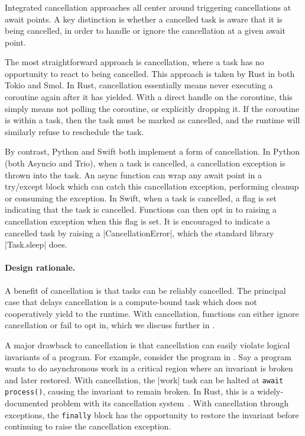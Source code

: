 \subsubsection{\Awareness}
\label{ssec:designdims:cooperation}

Integrated cancellation approaches all center around triggering cancellations at await points. A key distinction is whether a cancelled task is aware that it is being cancelled, in order to handle or ignore the cancellation at a given await point.

The most straightforward approach is \unaware cancellation, where a task has no opportunity to react to being cancelled. This approach is taken by Rust in both Tokio and Smol. In Rust, cancellation essentially means never executing a coroutine again after it has yielded. With a direct handle on the coroutine, this simply means not polling the coroutine, or explicitly dropping it. If the coroutine is within a task, then the task must be marked as cancelled, and the runtime will similarly refuse to reschedule the task.

By contrast, Python and Swift both implement a form of \aware cancellation. In Python (both Asyncio and Trio), when a task is cancelled, a cancellation exception is thrown into the task. An async function can wrap any await point in a try/except block which can catch this cancellation exception, performing cleanup or consuming the exception.
%
In Swift, when a task is cancelled, a flag is set indicating that the task is cancelled. Functions can then opt in to raising a cancellation exception when this flag is set. It is encouraged to indicate a cancelled task by raising a \code|CancellationError|, which the standard library \code|Task.sleep| does.

\paragraph{Design rationale.} A benefit of \unaware cancellation is that tasks can be reliably cancelled. The principal case that delays \unaware cancellation is a compute-bound task which does not cooperatively yield to the runtime. With \aware cancellation, functions can either ignore cancellation or fail to opt in, which we discuss further in .

A major drawback to \unaware cancellation is that cancellation can easily violate logical invariants of a program. For example, consider the program in . Say a program wants to do asynchronous work in a critical region where an invariant is broken and later restored. With \unaware cancellation, the \code|work| task can be halted at \lstinline[language=Pseudo]|await process()|, causing the invariant to remain broken. In Rust, this is a widely-documented problem with its cancellation system\footnotemark~\cite{paharia_400_2025,paharia_cancelling_2025}. With \aware cancellation through exceptions, the \lstinline[language=Pseudo]|finally| block has the opportunity to restore the invariant before continuing to raise the cancellation exception.

